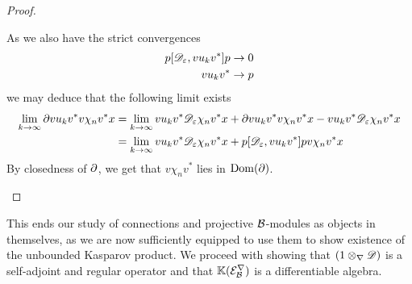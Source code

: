 \begin{proof}
\begin{enumerate}
	As we also have the strict convergences
	\begin{align*}
		p[\mathscr{D}_\varepsilon,vu_kv^*]p&\to 0 \\
		vu_kv^* &\to p 
	\end{align*}
	we may deduce that the following limit exists
	\begin{align*}
		\lim_{k\to \infty} \partial v u_k v^* v \chi_n v^* x&=\lim_{k\to \infty} vu_k v^*\mathscr{D}_\varepsilon \chi_n v^*x+ \partial v u_k v^* v \chi_n v^* x-vu_k v^*\mathscr{D}_\varepsilon \chi_n v^*x \\
		&=\lim_{k\to\infty} vu_k v^*\mathscr{D}_\varepsilon \chi_n v^*x +p[\mathscr{D}_\varepsilon,vu_kv^*]pv \chi_n v^* x
	\end{align*}
	By closedness of $\partial$, we get that $v\chi_n v^*$ lies in $\operatorname{Dom} (\partial)$. 
	\end{enumerate}
\end{proof}
This ends our study of connections and projective $\mathcal{B}$-modules as objects in themselves, as we are now sufficiently equipped to use them to show existence of the unbounded Kasparov product.  We proceed with showing that $(1\otimes_\nabla \mathscr{D})$ is a self-adjoint and regular operator and that $\mathbb{K}(\mathcal{E}^\nabla_{\mathcal{B}})$ is a differentiable algebra. 